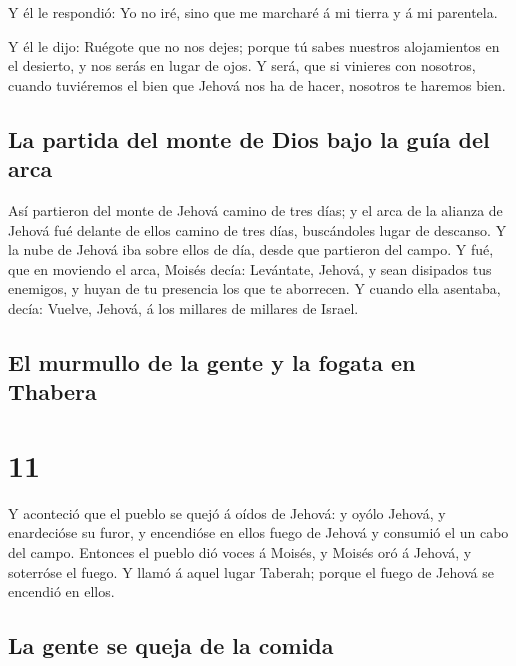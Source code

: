  Y él le respondió: Yo no iré, sino que me marcharé á mi
tierra y á mi parentela.

 Y él le dijo: Ruégote que no nos dejes; porque tú sabes
nuestros alojamientos en el desierto, y nos serás en lugar de ojos.
 Y será, que si vinieres con nosotros, cuando tuviéremos
el bien que Jehová nos ha de hacer, nosotros te haremos bien.

\hypertarget{la-partida-del-monte-de-dios-bajo-la-guuxeda-del-arca}{%
\subsection{La partida del monte de Dios bajo la guía del
arca}\label{la-partida-del-monte-de-dios-bajo-la-guuxeda-del-arca}}

 Así partieron del monte de Jehová camino de tres días; y
el arca de la alianza de Jehová fué delante de ellos camino de tres
días, buscándoles lugar de descanso.  Y la nube de Jehová
iba sobre ellos de día, desde que partieron del campo.  Y
fué, que en moviendo el arca, Moisés decía: Levántate, Jehová, y sean
disipados tus enemigos, y huyan de tu presencia los que te aborrecen.
 Y cuando ella asentaba, decía: Vuelve, Jehová, á los
millares de millares de Israel.

\hypertarget{el-murmullo-de-la-gente-y-la-fogata-en-thabera}{%
\subsection{El murmullo de la gente y la fogata en
Thabera}\label{el-murmullo-de-la-gente-y-la-fogata-en-thabera}}

\hypertarget{section-04-11}{%
\section{11}\label{section-04-11}}

 Y aconteció que el pueblo se quejó á oídos de Jehová: y
oyólo Jehová, y enardecióse su furor, y encendióse en ellos fuego de
Jehová y consumió el un cabo del campo.  Entonces el
pueblo dió voces á Moisés, y Moisés oró á Jehová, y soterróse el fuego.
 Y llamó á aquel lugar Taberah; porque el fuego de Jehová
se encendió en ellos.

\hypertarget{la-gente-se-queja-de-la-comida}{%
\subsection{La gente se queja de la
comida}\label{la-gente-se-queja-de-la-comida}}

